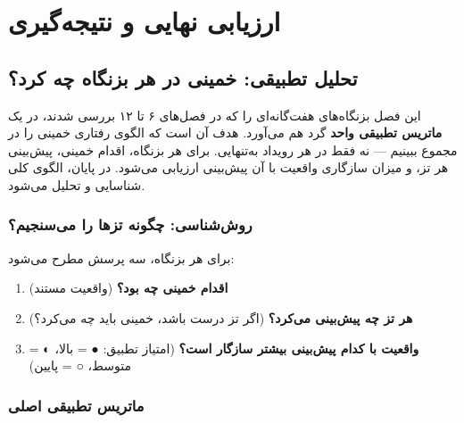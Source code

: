 \documentclass[12pt,a4paper]{book}
\newcommand{\keyword}[1]{\textbf{\textcolor{cPrimary}{#1}}}
\begin{document}
\part{ارزیابی نهایی و نتیجه‌گیری}

\chapter{تحلیل تطبیقی: خمینی در هر بزنگاه چه کرد؟}

\begin{infoBox}
این فصل بزنگاه‌های هفت‌گانه‌ای را که در فصل‌های ۶ تا ۱۲ بررسی شدند، در یک \keyword{ماتریس تطبیقی واحد} گرد هم می‌آورد. هدف آن است که الگوی رفتاری خمینی را در مجموع ببینیم — نه فقط در هر رویداد به‌تنهایی. برای هر بزنگاه، اقدام خمینی، پیش‌بینی هر تز، و میزان سازگاری واقعیت با آن پیش‌بینی ارزیابی می‌شود. در پایان، الگوی کلی شناسایی و تحلیل می‌شود.
\end{infoBox}

\section{روش‌شناسی: چگونه تزها را می‌سنجیم؟}

\begin{principleBox}
برای هر بزنگاه، سه پرسش مطرح می‌شود:
\begin{enumerate}[label=\textcolor{cPrimary}{\bfseries\arabic*.}, rightmargin=2em]
    \item \textbf{اقدام خمینی چه بود؟} (واقعیت مستند)
    \item \textbf{هر تز چه پیش‌بینی می‌کرد؟} (اگر تز درست باشد، خمینی باید چه می‌کرد؟)
    \item \textbf{واقعیت با کدام پیش‌بینی بیشتر سازگار است؟} (امتیاز تطبیق: ● = بالا، ◐ = متوسط، ○ = پایین)
\end{enumerate}
\end{principleBox}

\section{ماتریس تطبیقی اصلی}
\end{document}
